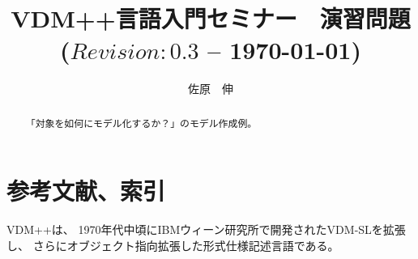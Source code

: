 \documentclass[a4paper,10pt]{jsarticle}
\begin{document}

\title{VDM++言語入門セミナー　演習問題\\
\small{($Revision: 0.3 $ -- \today)}}
\author{佐原　伸\\
}
\date{\mbox{}}
\maketitle

\begin{abstract}
\setlength{\baselineskip}{12pt plus .1pt}
「対象を如何にモデル化するか？」のモデル作成例。
\end{abstract}

\tableofcontents








%
%
%

\newpage

\section{参考文献、索引}
VDM++\cite{Kyushu2016PP}は、
1970年代中頃にIBMウィーン研究所で開発されたVDM-SL\cite{Kyushu2016SL}を拡張し、
さらにオブジェクト指向拡張した形式仕様記述言語である。
\end{document}
